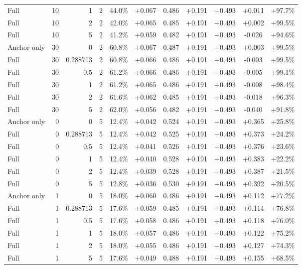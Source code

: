 \begin{table}[htbp]
\begin{tabular}{lrrrccccccc}
Full & 10 & 1 & 2 & 44.0\% & +0.067 & 0.486 & +0.191 & +0.493 & +0.011 & +97.7\% \\
Full & 10 & 2 & 2 & 42.0\% & +0.065 & 0.485 & +0.191 & +0.493 & +0.002 & +99.5\% \\
Full & 10 & 5 & 2 & 41.2\% & +0.059 & 0.482 & +0.191 & +0.493 & -0.026 & +94.6\% \\
Anchor only & 30 & 0 & 2 & 60.8\% & +0.067 & 0.487 & +0.191 & +0.493 & +0.003 & +99.5\% \\
Full & 30 & 0.288713 & 2 & 60.8\% & +0.066 & 0.486 & +0.191 & +0.493 & -0.003 & +99.5\% \\
Full & 30 & 0.5 & 2 & 61.2\% & +0.066 & 0.486 & +0.191 & +0.493 & -0.005 & +99.1\% \\
Full & 30 & 1 & 2 & 61.2\% & +0.065 & 0.486 & +0.191 & +0.493 & -0.008 & +98.4\% \\
Full & 30 & 2 & 2 & 61.6\% & +0.062 & 0.485 & +0.191 & +0.493 & -0.018 & +96.3\% \\
Full & 30 & 5 & 2 & 62.0\% & +0.056 & 0.482 & +0.191 & +0.493 & -0.040 & +91.8\% \\
Anchor only & 0 & 0 & 5 & 12.4\% & +0.042 & 0.524 & +0.191 & +0.493 & +0.365 & +25.8\% \\
Full & 0 & 0.288713 & 5 & 12.4\% & +0.042 & 0.525 & +0.191 & +0.493 & +0.373 & +24.2\% \\
Full & 0 & 0.5 & 5 & 12.4\% & +0.041 & 0.526 & +0.191 & +0.493 & +0.376 & +23.6\% \\
Full & 0 & 1 & 5 & 12.4\% & +0.040 & 0.528 & +0.191 & +0.493 & +0.383 & +22.2\% \\
Full & 0 & 2 & 5 & 12.4\% & +0.039 & 0.528 & +0.191 & +0.493 & +0.387 & +21.5\% \\
Full & 0 & 5 & 5 & 12.8\% & +0.036 & 0.530 & +0.191 & +0.493 & +0.392 & +20.5\% \\
Anchor only & 1 & 0 & 5 & 18.0\% & +0.060 & 0.486 & +0.191 & +0.493 & +0.112 & +77.2\% \\
Full & 1 & 0.288713 & 5 & 17.6\% & +0.059 & 0.485 & +0.191 & +0.493 & +0.114 & +76.8\% \\
Full & 1 & 0.5 & 5 & 17.6\% & +0.058 & 0.486 & +0.191 & +0.493 & +0.118 & +76.0\% \\
Full & 1 & 1 & 5 & 18.0\% & +0.057 & 0.486 & +0.191 & +0.493 & +0.122 & +75.2\% \\
Full & 1 & 2 & 5 & 18.0\% & +0.055 & 0.486 & +0.191 & +0.493 & +0.127 & +74.3\% \\
Full & 1 & 5 & 5 & 17.6\% & +0.049 & 0.488 & +0.191 & +0.493 & +0.155 & +68.5\% \\

\end{tabular}
\end{table}
